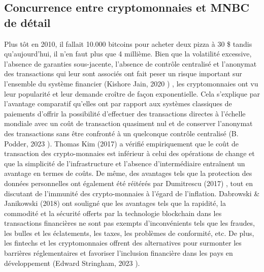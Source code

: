 \documentclass[12pt]{article}
\begin{document}
\subsection{Concurrence entre cryptomonnaies et MNBC de détail}

Plus tôt en 2010, il fallait 10.000 bitcoins pour acheter deux pizza à 30 \$ tandis qu'aujourd'hui, il n'en faut plus que 4 millième. Bien que la volatilité excessive, l'absence de garanties sous-jacente, l'absence de contrôle centralisé et l'anonymat des transactions qui leur sont associés ont fait peser un risque important sur l'ensemble du système financier (Kishore Jain, 2020 \cite{jain_economics_2020}) , les cryptomonnaies ont vu leur popularité et leur demande croître de façon exponentielle. Cela s'explique par l'avantage comparatif qu'elles ont par rapport aux systèmes classiques de paiements d'offrir la possibilité d'effectuer des transactions directes à l'échelle mondiale avec un coût de transaction quasiment nul et de conserver l'anonymat des transactions sans être confronté à un quelconque contrôle centralisé (B. Podder, 2023 \cite{Podder2023Cryptocurrency}). Thomas Kim (2017) \cite{kim_transaction_2017} a vérifié empiriquement que le coût de transaction des crypto-monnaies est inférieur à celui des opérations de change et que la simplicité de l'infrastructure et l'absence d'intermédiaire entraînent un avantage en termes de coûts. De même, des avantages tels que la protection des données personnelles ont également été réitérés par Dumitrescu (2017) \cite{RePEc:ntu:ntugeo:vol5-iss2-17-063}, tout en discutant de l'immunité des crypto-monnaies à l'égard de l'inflation. Dabrowski \& Janikowski (2018) \cite{dabrowski_virtual_2018} ont souligné que les avantages tels que la rapidité, la commodité et la sécurité offerts par la technologie blockchain dans les transactions financières ne sont pas exempts d'inconvénients tels que les fraudes, les bulles et les éclatements, les taxes, les problèmes de conformité, etc. De plus, les fintechs et les cryptomonnaies offrent des alternatives pour surmonter les barrières réglementaires et favoriser l'inclusion financière dans les pays en développement (Edward Stringham, 2023 \cite{stringham_banking_2023}).\\
\end{document}
